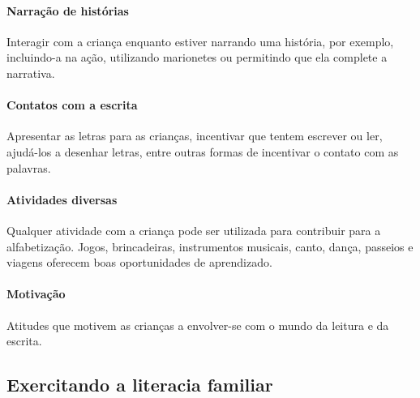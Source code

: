 \documentclass[11pt]{extarticle}
\begin{document}
\paragraph{Narração de histórias} Interagir com a criança enquanto 
estiver narrando uma história, por exemplo, incluindo-a na ação, utilizando 
marionetes ou permitindo que ela complete a narrativa.

\paragraph{Contatos com a escrita} Apresentar as letras para as 
crianças, incentivar que tentem escrever ou ler, ajudá-los a desenhar letras, 
entre outras formas de incentivar o contato com as palavras.

\paragraph{Atividades diversas} Qualquer atividade com a criança 
pode ser utilizada para contribuir para a alfabetização. Jogos, brincadeiras, 
instrumentos musicais, canto, dança, passeios e viagens oferecem boas 
oportunidades de aprendizado.

\paragraph{Motivação} Atitudes que motivem as crianças a envolver-se com 
o mundo da leitura e da escrita.

\subsection{Exercitando a literacia familiar}

\end{document}
